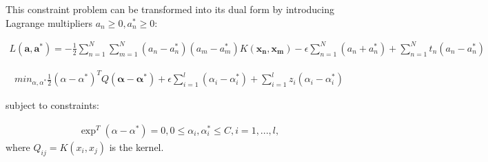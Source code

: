 \documentclass[12pt]{article}
\begin{document}
This constraint problem can be transformed into its dual form  by introducing Lagrange multipliers \(a_n \geq 0, a_n^* \geq 0\):

\begin{gather}
  L(\mathbf{a},\mathbf{a^*}) = -\frac{1}{2}\sum_{n=1}^{N}\sum_{m=1}^{N}(a_n-a_n^*)(a_m-a_m^*)K(\mathbf{x_n},\mathbf{x_m})
  -\epsilon\sum_{n=1}^{N}(a_n+a_n^*) + \sum_{n=1}^{N}t_n(a_n-a_n^*)
 \end{gather}

\begin{gather}
 min_{\alpha,\alpha^*} \frac{1}{2}(\alpha-\alpha^*)^T Q (\mathbf{\alpha - \alpha^*})+\epsilon 
\sum_{i=1}^{l}(\alpha_i-\alpha_i^*)+\sum_{i=1}^{l}z_i(\alpha_i-\alpha_i^*)
\end{gather}

subject to constraints:

\begin{gather}
\exp^T(\alpha-\alpha^*)=0, 0\leq\alpha_i,\alpha_i^*\leq C, i=1,...,l ,
\end{gather}
where \( Q_{ij}=K(x_i,x_j) \) is the kernel.
\end{document}
